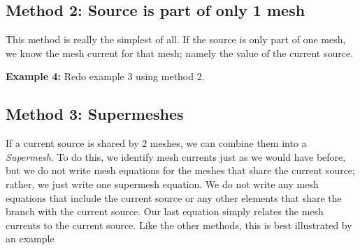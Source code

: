 \documentclass{handout}
\begin{document}
\newpage
\clearpage
\pagebreak

\subsection{Method 2: Source is part of only 1 mesh}
This method is really the simplest of all.  If the source is only part of one mesh, we know the mesh current for that mesh; namely the value of the current source.

\textbf{Example 4:} Redo example 3 using method 2.

\newpage
\clearpage
\pagebreak

\subsection{Method 3: Supermeshes}
If a current source is shared by 2 meshes, we can combine them into a {\em Supermesh}.  To do this, we identify mesh currents just as we would have before, but we do not write mesh equations for the meshes that share the current source; rather, we just write one supermesh equation.  We do not write any mesh equations that include the current source or any other elements that share the branch with the current source.  Our last equation simply relates the mesh currents to the current source.  Like the other methods, this is best illustrated by an example
\end{document}
